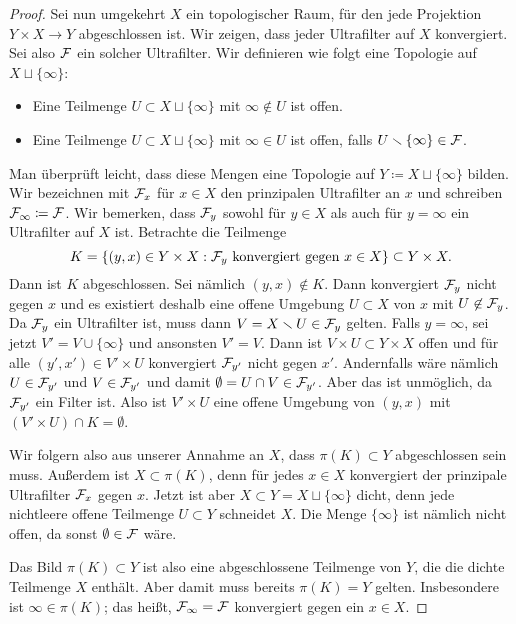 \begin{proof}
  Sei nun umgekehrt $X$ ein topologischer Raum, für den jede Projektion $Y\times X\to Y$ abgeschlossen ist. Wir zeigen, dass jeder Ultrafilter auf $X$ konvergiert. Sei also $\cal F$ ein solcher Ultrafilter. Wir definieren wie folgt eine Topologie auf $X\sqcup\{\infty\}$:
  \begin{itemize}
    \item Eine Teilmenge $U\subset X\sqcup\{\infty\}$ mit $\infty \not\in U$ ist offen.
    \item Eine Teilmenge $U\subset X\sqcup\{\infty\}$ mit $\infty\in U$ ist offen, falls $U\setminus\{\infty\}\in\cal F$.
  \end{itemize}
  Man überprüft leicht, dass diese Mengen eine Topologie auf $Y\coloneqq X\sqcup\{\infty\}$ bilden. Wir bezeichnen mit $\cal F_x$ für $x\in X$ den prinzipalen Ultrafilter an $x$ und schreiben $\cal F_\infty \coloneqq \cal F$. Wir bemerken, dass $\cal F_y$ sowohl für $y\in X$ als auch für $y = \infty$ ein Ultrafilter auf $X$ ist. Betrachte die Teilmenge
  \[
    K = \{ (y,x)\in Y\times X : \text{$\cal F_y$ konvergiert gegen $x\in X$} \} \subset Y\times X.
  \]
  Dann ist $K$ abgeschlossen. Sei nämlich $(y,x)\not\in K$. Dann konvergiert $\cal F_y$ nicht gegen $x$ und es existiert deshalb eine offene Umgebung $U\subset X$ von $x$ mit $U\not\in\cal F_y$. Da $\cal F_y$ ein Ultrafilter ist, muss dann $V = X\setminus U\in\cal F_y$ gelten. Falls $y=\infty$, sei jetzt $V' = V\cup\{\infty\}$ und ansonsten $V' = V$. Dann ist $V\times U\subset Y\times X$ offen und für alle $(y', x')\in V'\times U$ konvergiert $\cal F_{y'}$ nicht gegen $x'$. Andernfalls wäre nämlich $U\in\cal F_{y'}$ und $V\in\cal F_{y'}$ und damit $\emptyset = U\cap V\in\cal F_{y'}$. Aber das ist unmöglich, da $\cal F_{y'}$ ein Filter ist. Also ist $V'\times U$ eine offene Umgebung von $(y,x)$ mit $(V'\times U)\cap K = \emptyset$.

  Wir folgern also aus unserer Annahme an $X$, dass $\pi(K)\subset Y$ abgeschlossen sein muss. Außerdem ist $X\subset\pi(K)$, denn für jedes $x\in X$ konvergiert der prinzipale Ultrafilter $\cal F_x$ gegen $x$. Jetzt ist aber $X\subset Y = X\sqcup\{\infty\}$ dicht, denn jede nichtleere offene Teilmenge $U\subset Y$ schneidet $X$. Die Menge $\{\infty\}$ ist nämlich nicht offen, da sonst $\emptyset\in\cal F$ wäre.

  Das Bild $\pi(K)\subset Y$ ist also eine abgeschlossene Teilmenge von $Y$, die die dichte Teilmenge $X$ enthält. Aber damit muss bereits $\pi(K) = Y$ gelten. Insbesondere ist $\infty\in\pi(K)$; das heißt, $\cal F_\infty = \cal F$ konvergiert gegen ein $x\in X$.
\end{proof}

